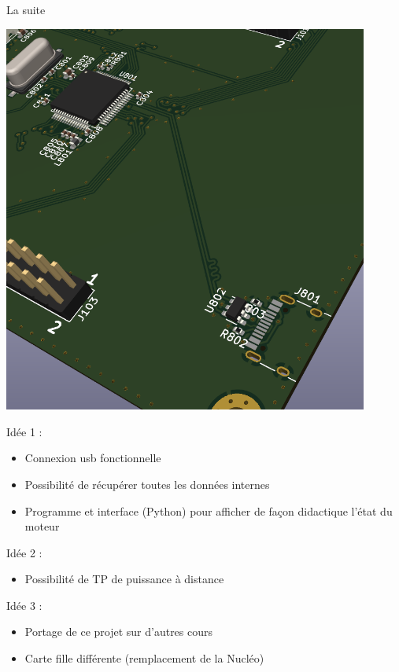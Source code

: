 \documentclass[aspectratio=169]{beamer}
\begin{document}
\begin{frame}{La suite}
\begin{minipage}{0.39\textwidth}
\begin{center}
	\includegraphics[width=0.9\textwidth]{figures/usb.png} 
\end{center}
\end{minipage}
\begin{minipage}{0.59\textwidth}
Idée 1 : 
\begin{itemize}
	\item Connexion usb fonctionnelle
	\item Possibilité de récupérer toutes les données internes
	\item Programme et interface (Python) pour afficher de façon didactique l'état du moteur
\end{itemize}
Idée 2 : 
\begin{itemize}
	\item Possibilité de TP de puissance à distance
\end{itemize}
Idée 3 : 
\begin{itemize}
	\item Portage de ce projet sur d'autres cours 
	\item Carte fille différente (remplacement de la Nucléo)
\end{itemize}
\end{minipage}
\end{frame}
\end{document}
